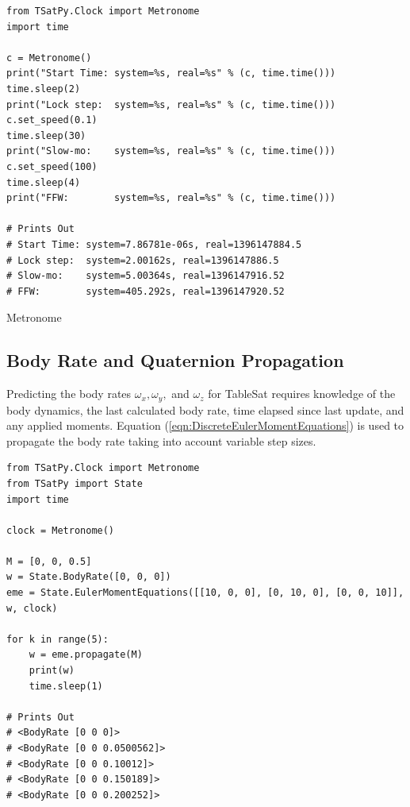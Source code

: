 \begin{listing}[H]
\begin{singlespace}
  \begin{verbatim}
from TSatPy.Clock import Metronome
import time

c = Metronome()
print("Start Time: system=%s, real=%s" % (c, time.time()))
time.sleep(2)
print("Lock step:  system=%s, real=%s" % (c, time.time()))
c.set_speed(0.1)
time.sleep(30)
print("Slow-mo:    system=%s, real=%s" % (c, time.time()))
c.set_speed(100)
time.sleep(4)
print("FFW:        system=%s, real=%s" % (c, time.time()))

# Prints Out
# Start Time: system=7.86781e-06s, real=1396147884.5
# Lock step:  system=2.00162s, real=1396147886.5
# Slow-mo:    system=5.00364s, real=1396147916.52
# FFW:        system=405.292s, real=1396147920.52
  \end{verbatim}
\caption{Metronome}
\label{code:metronome}
\nocite{minted}
\end{singlespace}
\end{listing}


\subsection{Body Rate and Quaternion Propagation}
\label{subsec:BodyRateQuaternionPropagation}

Predicting the body rates $\omega_x, \omega_y,$ and $\omega_z$ for TableSat requires knowledge of the body dynamics, the last calculated body rate, time elapsed since last update, and any applied moments.  Equation (\ref{eqn:DiscreteEulerMomentEquations}) is used to propagate the body rate taking into account variable step sizes.

\begin{singlespace}
  \begin{verbatim}
from TSatPy.Clock import Metronome
from TSatPy import State
import time

clock = Metronome()

M = [0, 0, 0.5]
w = State.BodyRate([0, 0, 0])
eme = State.EulerMomentEquations([[10, 0, 0], [0, 10, 0], [0, 0, 10]], w, clock)

for k in range(5):
    w = eme.propagate(M)
    print(w)
    time.sleep(1)

# Prints Out
# <BodyRate [0 0 0]>
# <BodyRate [0 0 0.0500562]>
# <BodyRate [0 0 0.10012]>
# <BodyRate [0 0 0.150189]>
# <BodyRate [0 0 0.200252]>
  \end{verbatim}
\nocite{minted}
\end{singlespace}

